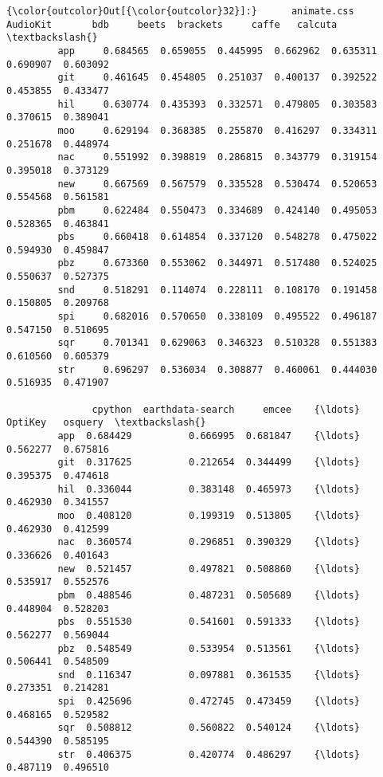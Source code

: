 \documentclass[11pt]{article}
\begin{document}
\begin{Verbatim}[commandchars=\\\{\}]
{\color{outcolor}Out[{\color{outcolor}32}]:}      animate.css  AudioKit       bdb     beets  brackets     caffe   calcuta  \textbackslash{}
         app     0.684565  0.659055  0.445995  0.662962  0.635311  0.690907  0.603092   
         git     0.461645  0.454805  0.251037  0.400137  0.392522  0.453855  0.433477   
         hil     0.630774  0.435393  0.332571  0.479805  0.303583  0.370615  0.389041   
         moo     0.629194  0.368385  0.255870  0.416297  0.334311  0.251678  0.448974   
         nac     0.551992  0.398819  0.286815  0.343779  0.319154  0.395018  0.373129   
         new     0.667569  0.567579  0.335528  0.530474  0.520653  0.554568  0.561581   
         pbm     0.622484  0.550473  0.334689  0.424140  0.495053  0.528365  0.463841   
         pbs     0.660418  0.614854  0.337120  0.548278  0.475022  0.594930  0.459847   
         pbz     0.673360  0.553062  0.344971  0.517480  0.524025  0.550637  0.527375   
         snd     0.518291  0.114074  0.228111  0.108170  0.191458  0.150805  0.209768   
         spi     0.682016  0.570650  0.338109  0.495522  0.496187  0.547150  0.510695   
         sqr     0.701341  0.629063  0.346323  0.510328  0.551383  0.610560  0.605379   
         str     0.696297  0.536034  0.308877  0.460061  0.444030  0.516935  0.471907   
         
               cpython  earthdata-search     emcee    {\ldots}      OptiKey   osquery  \textbackslash{}
         app  0.684429          0.666995  0.681847    {\ldots}     0.562277  0.675816   
         git  0.317625          0.212654  0.344499    {\ldots}     0.395375  0.474618   
         hil  0.336044          0.383148  0.465973    {\ldots}     0.462930  0.341557   
         moo  0.408120          0.199319  0.513805    {\ldots}     0.462930  0.412599   
         nac  0.360574          0.296851  0.390329    {\ldots}     0.336626  0.401643   
         new  0.521457          0.497821  0.508860    {\ldots}     0.535917  0.552576   
         pbm  0.488546          0.487231  0.505689    {\ldots}     0.448904  0.528203   
         pbs  0.551530          0.541601  0.591333    {\ldots}     0.562277  0.569044   
         pbz  0.548549          0.533954  0.513561    {\ldots}     0.506441  0.548509   
         snd  0.116347          0.097881  0.361535    {\ldots}     0.273351  0.214281   
         spi  0.425696          0.472745  0.473459    {\ldots}     0.468165  0.529582   
         sqr  0.508812          0.560822  0.540124    {\ldots}     0.544390  0.585195   
         str  0.406375          0.420774  0.486297    {\ldots}     0.487119  0.496510   
         

\end{Verbatim}
\end{document}
